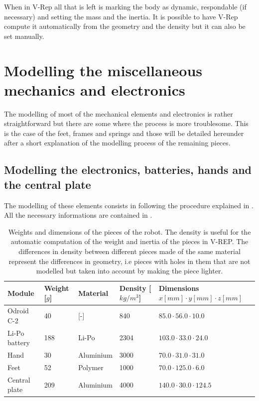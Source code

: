 When in V-Rep all that is left is marking the body as dynamic, respondable (if necessary) and setting the mass and the inertia. It is possible to have V-Rep compute it automatically from the geometry and the density but it can also be set manually.

\section{Modelling the miscellaneous mechanics and electronics}
The modelling of most of the mechanical elements and electronics is rather straightforward but there are some where the process is more troublesome. This is the case of the feet, frames and springs and those will be detailed hereunder after a short explanation of the modelling process of the remaining pieces.

\subsection{Modelling the electronics, batteries, hands and the central plate}
The modelling of these elements consists in following the procedure explained in . All the necessary informations are contained in .

\begin{table}[htp]
\center
\begin{tabularx}{\textwidth}{@{} l l X X p{4.1cm} @{}}
\toprule
\textbf{Module} & \textbf{Weight [$g$]} & \textbf{Material} &  \textbf{Density [$kg/m^3$]}& \textbf{Dimensions $x[mm] \cdot y[mm] \cdot z[mm]$}\\ 
\midrule
Odroid C-2 & 40 & [-] & 840 & $85.0 \cdot 56.0 \cdot 10.0$\\
Li-Po battery & 188 & Li-Po & 2304 & $103.0 \cdot 33.0 \cdot 24.0$\\
Hand & 30 & Aluminium & 3000 & $70.0 \cdot 31.0 \cdot 31.0$\\
Feet & 52 & Polymer & 1000 & $70.0 \cdot 125.0 \cdot 6.0$\\
Central plate & 209 & Aluminium & 4000 & $140.0 \cdot 30.0 \cdot 124.5$\\
\bottomrule
\end{tabularx}
\caption[Weights and dimensions of the pieces of the robot]{Weights and dimensions of the pieces of the robot. The density is useful for the automatic computation of the weight and inertia of the pieces in V-REP. The differences in density between different pieces made of the same material represent the differences in geometry, i.e pieces with holes in them that are not modelled but taken into account by making the piece lighter.}
\label{table:weights}
\end{table}

